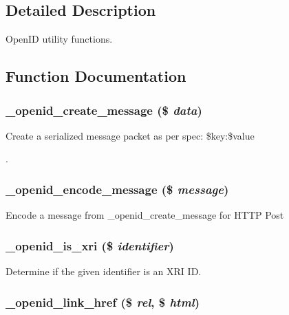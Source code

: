 \subsection{Detailed Description}
OpenID utility functions. 

\subsection{Function Documentation}
\hypertarget{openid_8inc_5d5952e825b3e17cc2765760baf69d4f}{
\subsubsection[{\_\-openid\_\-create\_\-message}]{\setlength{\rightskip}{0pt plus 5cm}\_\-openid\_\-create\_\-message (\$ {\em data})}}
\label{openid_8inc_5d5952e825b3e17cc2765760baf69d4f}


Create a serialized message packet as per spec: \$key:\$value\par
 . \hypertarget{openid_8inc_367a73e53a7544157b49ffbedcbdb444}{
\subsubsection[{\_\-openid\_\-encode\_\-message}]{\setlength{\rightskip}{0pt plus 5cm}\_\-openid\_\-encode\_\-message (\$ {\em message})}}
\label{openid_8inc_367a73e53a7544157b49ffbedcbdb444}


Encode a message from \_\-openid\_\-create\_\-message for HTTP Post \hypertarget{openid_8inc_867ccbcc067a82d3bc691a6cdc1ad9f4}{
\subsubsection[{\_\-openid\_\-is\_\-xri}]{\setlength{\rightskip}{0pt plus 5cm}\_\-openid\_\-is\_\-xri (\$ {\em identifier})}}
\label{openid_8inc_867ccbcc067a82d3bc691a6cdc1ad9f4}


Determine if the given identifier is an XRI ID. \hypertarget{openid_8inc_413931ae272accf7e4161d5b032d4631}{
\subsubsection[{\_\-openid\_\-link\_\-href}]{\setlength{\rightskip}{0pt plus 5cm}\_\-openid\_\-link\_\-href (\$ {\em rel}, \/  \$ {\em html})}}
\label{openid_8inc_413931ae272accf7e4161d5b032d4631}


